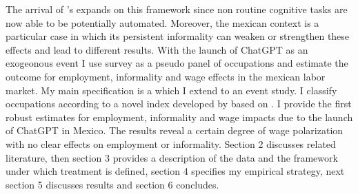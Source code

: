 The arrival of 's expands on this framework since non routine cognitive tasks are now able to be potentially automated. Moreover, the mexican context is a particular case in which its persistent informality can weaken or strengthen these effects and lead to different results. With the launch of ChatGPT as an exogeonous event I use  survey as a pseudo panel of occupations and estimate the outcome for employment, informality and wage effects in the mexican labor market. My main specification is a  which I extend to an event study. I classify occupations according to a novel index developed by \cite{martinez2024risk} based on \cite{eloundou2023gptsgptsearlylook}. I provide the first robust estimates for employment, informality and wage impacts due to the launch of ChatGPT in Mexico. The results reveal a certain degree of wage polarization with no clear effects on employment or informality. Section 2 discusses related literature, then section 3 provides a description of the data and the framework under which treatment is defined, section 4 specifies my empirical strategy, next section 5 discusses results and section 6 concludes.
